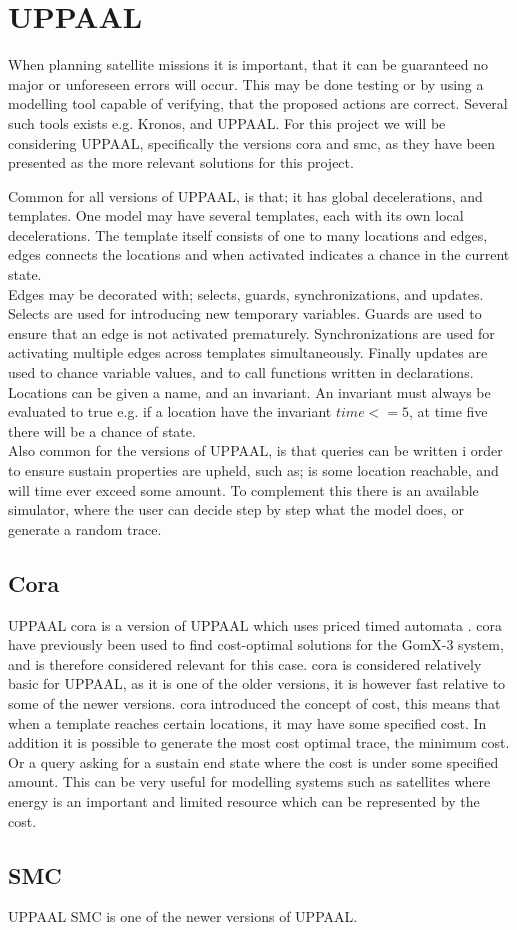\section{UPPAAL}
When planning satellite missions it is important, that it can be guaranteed no major or unforeseen errors will occur. This may be done testing or by using a modelling tool capable of verifying, that the proposed actions are correct\cite{cs_smc}. Several such tools exists e.g. Kronos, and UPPAAL. For this project we will be considering UPPAAL, specifically the versions \gls{cora} and \gls{smc}, as they have been presented as the more relevant solutions for this project.

Common for all versions of UPPAAL, is that; it has global decelerations, and templates. One model may have several templates, each with its own local decelerations. The template itself consists of one to many locations and edges, edges connects the locations and when activated indicates a chance in the current state.\\
Edges may be decorated with; selects, guards, synchronizations, and updates. Selects are used for introducing new temporary variables. Guards are used to ensure that an edge is not activated prematurely. Synchronizations are used for activating multiple edges across templates simultaneously. Finally updates are used to chance variable values, and to call functions written in declarations.\\
Locations can be given a name, and an invariant. An invariant must always be evaluated to true e.g. if a location have the invariant $time <= 5$, at time five there will be a chance of state.\\
Also common for the versions of UPPAAL, is that queries can be written i order to ensure sustain properties are upheld, such as; is some location reachable, and will time ever exceed some amount. To complement this there is an available simulator, where the user can decide step by step what the model does, or generate a random trace.


\subsection{Cora}
UPPAAL \gls{cora} is a version of UPPAAL which uses priced timed automata \cite{cs_cora}. \Gls{cora} have previously been used to find cost-optimal solutions for the GomX-3 system\cite{gomx3}, and is therefore considered relevant for this case.
\Gls{cora} is considered relatively basic for UPPAAL, as it is one of the older versions, it is however fast relative to some of the newer versions. \Gls{cora} introduced the concept of cost, this means that when a template reaches certain locations, it may have some specified cost. In addition it is possible to generate the most cost optimal trace, the minimum cost. Or a query asking for a sustain end state where the cost is under some specified amount.
This can be very useful for modelling systems such as satellites where energy is an important and limited resource which can be represented by the cost.


\subsection{SMC}
UPPAAL SMC is one of the newer versions of UPPAAL.


